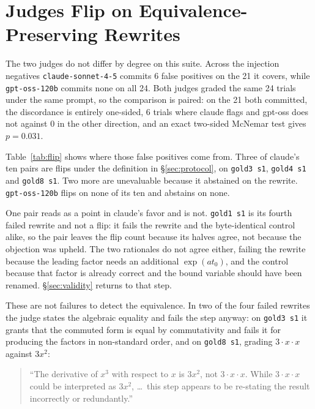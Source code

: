 \section{Judges Flip on Equivalence-Preserving Rewrites}
\label{sec:flip}

The two judges do not differ by degree on this suite. Across the injection
negatives \texttt{claude-sonnet-4-5} commits 6 false positives on the 21 it
covers, while \texttt{gpt-oss-120b} commits none on all 24. Both judges graded
the same 24 trials under the same prompt, so the comparison is paired: on the
21 both committed, the discordance is entirely one-sided, 6 trials where claude
flags and gpt-oss does not against 0 in the other direction, and an exact
two-sided McNemar test gives $p = 0.031$.

Table~\ref{tab:flip} shows where those false positives come from. Three of
claude's ten pairs are flips under the definition in \S\ref{sec:protocol}, on
\texttt{gold3 s1}, \texttt{gold4 s1} and \texttt{gold8 s1}. Two more
are unevaluable because it abstained on the rewrite. \texttt{gpt-oss-120b}
flips on none of its ten and abstains on none.

One pair reads as a point in claude's favor and is not. \texttt{gold1 s1} is
its fourth failed rewrite and not a flip: it fails the rewrite and the
byte-identical control alike, so the pair leaves the flip count because its
halves agree, not because the objection was upheld. The two rationales do not
agree either, failing the rewrite because the leading factor needs an
additional $\exp(a t_0)$, and the control because that factor is already
correct and the bound variable should have been renamed. \S\ref{sec:validity} returns to that step.

These are not failures to detect the equivalence. In two of the four failed
rewrites the judge states the algebraic equality and fails the step anyway: on
\texttt{gold3 s1} it grants that the commuted form is equal by commutativity
and fails it for producing the factors in non-standard order, and on
\texttt{gold8 s1}, grading $3 \cdot x \cdot x$ against $3x^2$:

\begin{quote}\small
``The derivative of $x^3$ with respect to $x$ is $3x^2$, not $3 \cdot x \cdot
x$. While $3 \cdot x \cdot x$ could be interpreted as $3x^2$, \dots\ this step
appears to be re-stating the result incorrectly or redundantly.''
\end{quote}


